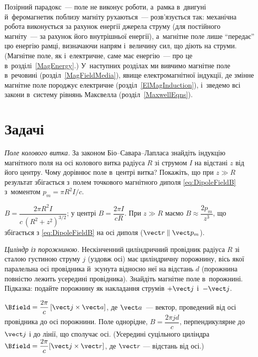Позірний парадокс~--- поле не виконує роботи, а~рамка в~двигуні й~феромагнетик поблизу
магніту рухаються~--- розв'язується так: механічна робота виконується за рахунок енергії
джерела струму (для постійного магніту~--- за рахунок його внутрішньої енергії), а~магнітне поле лише \enquote{передає} цю енергію
рамці, визначаючи напрям і~величину сил, що діють на струми. (Магнітне поле, як
і~електричне, саме має енергію~--- про це в~розділі~\ref{MagEnergy}.) У~наступних розділах ми
вивчимо магнітне поле в~речовині (розділ~\ref{MagFieldMedia}), явище електромагнітної
індукції, де змінне магнітне поле породжує електричне (розділ~\ref{ElMagInduction}),
і~зведемо всі закони в~систему рівнянь Максвелла (розділ~\ref{MaxwellEqns}).


\section*{Задачі}
 {}


\begin{problem}\label{prb:LoopAxisField}
	\emph{Поле колового витка.} За законом Біо--Савара--Лапласа знайдіть індукцію
	магнітного поля на осі колового витка радіуса $R$ зі струмом $I$ на відстані $z$ від
	його центру. Чому дорівнює поле в~центрі витка? Покажіть, що при $z\gg R$ результат
	збігається з~полем точкового магнітного диполя \eqref{eq:DipoleFieldB} з~моментом
	$p_m=\pi R^2I/c$.
	\begin{solution}
		$B=\dfrac{2\pi R^2I}{c\,(R^2+z^2)^{3/2}}$; у центрі $B=\dfrac{2\pi I}{cR}$. При $z\gg R$ маємо $B\approx\dfrac{2p_m}{z^3}$, що збігається з \eqref{eq:DipoleFieldB} на осі диполя ($\vect r\parallel\vect p_m$).
	\end{solution}
\end{problem}

\begin{problem}\label{prb:CylinderCavity}
	\emph{Циліндр із порожниною.} Нескінченний циліндричний провідник радіуса $R$ зі
	сталою густиною струму $j$ (уздовж осі) має циліндричну порожнину, вісь якої
	паралельна осі провідника й~зсунута відносно неї на відстань $d$ (порожнина повністю
	лежить усередині провідника). Знайдіть магнітне поле в~порожнині. Підказка: подайте
	порожнину як накладання струмів $+\vect j$ і~$-\vect j$.
	\begin{solution}
		$\Bfield=\dfrac{2\pi}{c}\,[\vect j\times\vect a]$, де $\vect a$~--- вектор, проведений від осі провідника до осі порожнини.
		   Поле однорідне, $B=\dfrac{2\pi jd}{c}$, перпендикулярне до $\vect j$ і до лінії, що сполучає осі. (Усередині суцільного циліндра $\Bfield=\dfrac{2\pi}{c}[\vect j\times\vect r]$, де $\vect r$ --- відстань від осі.)
	\end{solution}
\end{problem}

